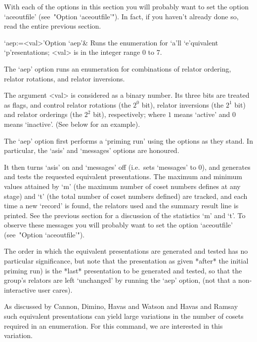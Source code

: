 
With each of the options in this section you will probably want to set
the option `aceoutfile' (see~"Option `aceoutfile'").  In  fact,  if  you
haven't already done so,  read  the  entire  previous  section.

\beginitems

\>`aep:=<val>'{Option `aep'}&
Runs  the enumeration for `a'll `e'quivalent `p'resentations;
<val> is in the integer range 0 to 7.

\enditems

The `aep' option runs  an  enumeration  for  combinations  of  relator
ordering, relator rotations, and relator inversions.

The argument <val> is considered as a binary number.  Its  three  bits
are treated as flags, and control relator rotations (the  $2^0$  bit),
relator inversions (the $2^1$ bit) and relator  orderings  (the  $2^2$
bit),  respectively;  where  $1$  means  \lq{}active'  and  $0$  means
\lq{}inactive'. (See below for an example).

The `aep' option first performs a \lq{}priming run' using the  options
as they stand. In particular, the `asis' and  `messages'  options  are
honoured.

It then turns `asis' on and `messages' off  (i.e.~sets  `messages'  to
0), and generates and tests the  requested  equivalent  presentations.
The maximum and minimum values attained by `m' (the maximum number  of
coset numbers defines at any stage) and `t' (the total number of coset
numbers defined) are tracked, and each  time  a  new  \lq{}record'  is
found, the relators used and the summary result line is  printed.  See
the previous section for a discussion of the statistics `m'  and  `t'.
To observe these messages you will probably want  to  set  the  option
`aceoutfile' (see~"Option `aceoutfile'").

The order in which the  equivalent  presentations  are  generated  and
tested has no particular significance, but note that the  presentation
as given *after* the initial priming run) is the  *last*  presentation
to be generated and tested, so that  the  group's  relators  are  left
`unchanged' by running the `aep' option, (not that  a  non-interactive
user cares).

As discussed by Cannon, Dimino, Havas  and  Watson  \cite{CDHW73}  and
Havas and Ramsay \cite{HR99b} such equivalent presentations can  yield
large variations in the number of cosets required in  an  enumeration.
For this command, we are interested in this variation.

